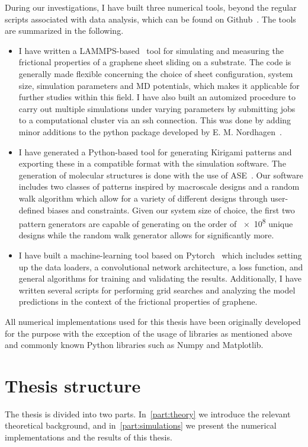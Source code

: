 During our investigations, I have built three numerical tools, beyond the
regular scripts associated with data analysis, which can be found on
Github~\cite{Github}. The tools are summarized in the following. 
\begin{itemize}
    \item I have written a LAMMPS-based~\cite{LAMMPS} tool for simulating and
    measuring the frictional properties of a graphene sheet sliding on a
    substrate. The code is generally made flexible concerning the choice of
    sheet configuration, system size, simulation parameters and \acrshort{MD}
    potentials, which makes it applicable for further studies within this field.
    I have also built an automized procedure to carry out multiple simulations
    under varying parameters by submitting jobs to a computational cluster via
    an ssh connection. This was done by adding minor additions to the python package developed by E. M. Nordhagen~\cite{lammps_simulator}.
    \item I have generated a Python-based tool for generating Kirigami patterns
    and exporting these in a compatible format with the simulation software. The
    generation of molecular structures is done with the use of
    ASE~\cite{ase-paper}. Our software includes two classes of patterns inspired
    by macroscale designs and a random walk algorithm which allow for a variety
    of different designs through user-defined biases and constraints. Given our
    system size of choice, the first two pattern generators are capable of
    generating on the order of \num{e8} unique designs while the random walk
    generator allows for significantly more. 
    \item I have built a machine-learning tool based on
    Pytorch~\cite{NEURIPS2019_9015} which includes setting up the data loaders,
    a convolutional network architecture, a loss function, and general
    algorithms for training and validating the results. Additionally, I have
    written several scripts for performing grid searches and analyzing the model
    predictions in the context of the frictional properties of graphene. 
\end{itemize}
All numerical implementations used for this thesis have been originally
developed for the purpose with the exception of the usage of libraries as
mentioned above and commonly known Python libraries such as Numpy and
Matplotlib.

\section{Thesis structure}
The thesis is divided into two parts. In~\cref{part:theory} we introduce the
relevant theoretical background, and in~\cref{part:simulations} we present the
numerical implementations and the results of this thesis.

